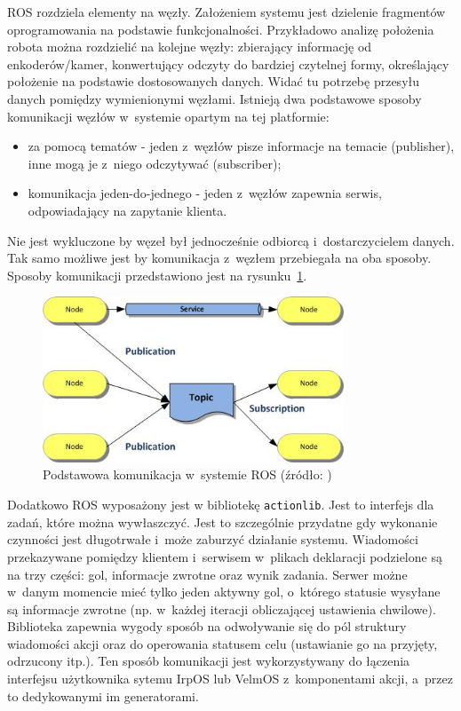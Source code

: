 		ROS rozdziela elementy na węzły. Założeniem systemu jest dzielenie fragmentów oprogramowania na podstawie funkcjonalności. Przykładowo analizę położenia robota można rozdzielić na kolejne węzły: zbierający informację od enkoderów/kamer, konwertujący odczyty do bardziej czytelnej formy, określający położenie na podstawie dostosowanych danych. Widać tu potrzebę przesyłu danych pomiędzy wymienionymi węzłami. Istnieją dwa podstawowe sposoby komunikacji węzłów w~systemie opartym na tej platformie:
		\begin{itemize}
			\item za pomocą tematów - jeden z~węzłów pisze informacje na temacie (publisher), inne mogą je z~niego odczytywać (subscriber);
			\item komunikacja jeden-do-jednego - jeden z~węzłów zapewnia serwis, odpowiadający na zapytanie klienta.
		\end{itemize}
		Nie jest wykluczone by węzeł był jednocześnie odbiorcą i~dostarczycielem danych. Tak samo możliwe jest by komunikacja z~węzłem przebiegała na oba sposoby. Sposoby komunikacji przedstawiono jest na rysunku~\ref{f:ros_komunikacja}.
		\begin{figure}[h]
			\centering
			\includegraphics[width=0.8\textwidth]{obrazy/Concepts-de-base-de-ROS.jpg}
			\caption{Podstawowa komunikacja w~systemie ROS (źródło: \cite{whatROS})}
			\label{f:ros_komunikacja}
		\end{figure}
		
		
		Dodatkowo ROS wyposażony jest w bibliotekę \texttt{actionlib}. Jest to interfejs dla zadań, które można wywłaszczyć\cite{actionlibROS}. Jest to szczególnie przydatne gdy wykonanie czynności jest długotrwałe i~może zaburzyć działanie systemu. Wiadomości przekazywane pomiędzy klientem i~serwisem w~plikach deklaracji podzielone są na trzy części: gol, informacje zwrotne oraz wynik zadania. Serwer możne w~danym momencie mieć tylko jeden aktywny gol, o~którego statusie wysyłane są informacje zwrotne (np. w~każdej iteracji obliczającej ustawienia chwilowe). Biblioteka zapewnia wygody sposób na odwoływanie się do pól struktury wiadomości akcji oraz do operowania statusem celu (ustawianie go na przyjęty, odrzucony itp.). Ten sposób komunikacji jest wykorzystywany do łączenia interfejsu użytkownika sytemu IrpOS lub VelmOS z~komponentami akcji, a~przez to dedykowanymi im generatorami.
		

